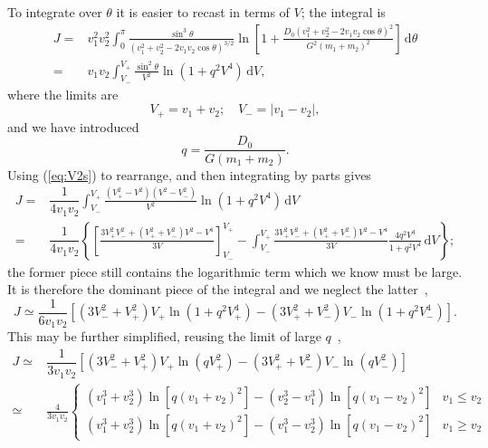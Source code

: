 \documentclass[useAMS,usedcolumn,usegraphicx,usenatbib]{mn2e}
\newcommand{\eqnref}[1]{(\ref{eq:#1})}
\newcommand{\dd}{\ensuremath{\mathrm{d}}}
\newcommand{\intd}[4]{\ensuremath{\displaystyle \int_{#1}^{#2}{#3}\,\dd{#4}}}
\newcommand{\recip}[1]{\ensuremath{\dfrac{1}{#1}}}
\begin{document}
\begin{onecolumn}
To integrate over $\theta$ it is easier to recast in terms of $V$; the integral is
\begin{align}
J = {} & v_1^2 v_2^2 \intd{0}{\pi}{\frac{\sin^3\theta}{\left(v_1^2 + v_2^2 - 2v_1 v_2 \cos\theta\right)^{3/2}}\ln\left[1 + \frac{D_0\left(v_1^2 + v_2^2 - 2v_1 v_2 \cos\theta\right)^2}{G^2\left(m_1 + m_2\right)^2}\right]}{\theta} \\
 = {} & v_1 v_2 \intd{V_-}{V_+}{\frac{\sin^2\theta}{V^2}\ln\left(1 + q^2V^4\right)}{V},
\end{align}
where the limits are
\begin{equation}
V_+ = v_1 + v_2; \quad V_- = |v_1 - v_2|,
\end{equation}
and we have introduced
\begin{equation}
q = \frac{D_0}{G\left(m_1+m_2\right)}.
\end{equation}
Using \eqnref{V2s} to rearrange, and then integrating by parts gives
\begin{align}
J = {} & \recip{4 v_1 v_2} \intd{V_-}{V_+}{\frac{\left(V_+^2 - V^2\right)\left(V^2 - V_-^2\right)}{V^2}\ln\left(1 + q^2V^4\right)}{V} \\
 = {} & \recip{4 v_1 v_2} \left\{\left[\frac{3V_+^2V_-^2 + \left(V_+^2 + V_-^2\right)V^2 - V^4}{3V}\right]^{V_+}_{V_-} - \intd{V_-}{V_+}{\frac{3V_+^2V_-^2 + \left(V_+^2 + V_-^2\right)V^2 - V^4}{3V}\frac{4q^2V^3}{1+ q^2V^4}}{V}\right\};
\end{align}
the former piece still contains the logarithmic term which we know must be large. It is therefore the dominant piece of the integral and we neglect the latter~\citep{Chandrasekhar1941},
\begin{equation}
J \simeq \recip{6 v_1 v_2} \left[\left(3V_-^2 + V_+^2\right)V_+\ln\left(1 + q^2V_+^4\right) - \left(3V_+^2 + V_-^2\right)V_-\ln\left(1 + q^2V_-^4\right)\right].
\end{equation}
This may be further simplified, reusing the limit of large $q$~\citep{Chandrasekhar1941,Chandrasekhar1941b},
\begin{align}
J \simeq {} & \recip{3 v_1 v_2} \left[\left(3V_-^2 + V_+^2\right)V_+\ln\left(qV_+^2\right) - \left(3V_+^2 + V_-^2\right)V_-\ln\left(qV_-^2\right)\right] \\
 \simeq {} & \frac{4}{3v_1v_2}\begin{cases}
\left(v_1^3 + v_2^3\right)\ln\left[q\left(v_1 + v_2\right)^2\right] - \left(v_2^3 - v_1^3\right)\ln\left[q\left(v_1 - v_2\right)^2\right] & v_1 \leq v_2 \\
\left(v_1^3 + v_2^3\right)\ln\left[q\left(v_1 + v_2\right)^2\right] - \left(v_1^3 - v_2^3\right)\ln\left[q\left(v_1 - v_2\right)^2\right] & v_1 \geq v_2

\end{cases}
\end{align}
\end{onecolumn}
\end{document}
